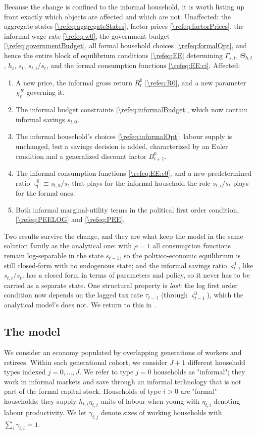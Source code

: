 \documentclass[a4paper]{article}
\begin{document}
Because the change is confined to the informal household, it is worth listing up front exactly which objects are affected and which are not. Unaffected: the aggregate states \eqref{\refeq:aggregateStates}, factor prices \eqref{\refeq:factorPrices}, the informal wage rate \eqref{\refeq:w0}, the government budget \eqref{\refeq:governmentBudget}, all formal household choices \eqref{\refeq:formalOpt}, and hence the entire block of equilibrium conditions \eqref{\refeq:EE} determining $\Gamma_{s,t}$, $\Theta_{h,t}$, $h_t$, $s_t$, $s_{t,i}/s_t$, and the formal consumption functions \eqref{\refeq:EE:ci}. Affected:
\begin{enumerate}
    \item A new price, the informal gross return $R_t^0$ \eqref{\refeq:R0}, and a new parameter $\chi_t^R$ governing it.
    \item The informal budget constraints \eqref{\refeq:informalBudget}, which now contain informal savings $s_{t,0}$.
    \item The informal household's choices \eqref{\refeq:informalOpt}: labour supply is unchanged, but a savings decision is added, characterized by an Euler condition and a generalized discount factor $B_{t+1}^0$.
    \item The informal consumption functions \eqref{\refeq:EE:c0}, and a new predetermined ratio $\varsigma_{t}^0 \equiv s_{t,0}/s_t$ that plays for the informal household the role $s_{t,i}/s_t$ plays for the formal ones.
    \item Both informal marginal-utility terms in the political first order condition, \eqref{\refeq:PEELOG} and \eqref{\refeq:PEE}.
\end{enumerate}
Two results survive the change, and they are what keep the model in the same solution family as the analytical one: with $\rho=1$ all consumption functions remain log-separable in the state $s_{t-1}$, so the politico-economic equilibrium is still closed-form with no endogenous state; and the informal savings ratio $\varsigma_t^0$, like $s_{t,i}/s_t$, has a closed form in terms of parameters and policy, so it never has to be carried as a separate state. One structural property is \emph{lost}: the log first order condition now depends on the lagged tax rate $\tau_{t-1}$ (through $\varsigma_{t-1}^0$), which the analytical model's does not. We return to this in .


\subsection{The model}\label{\refsec:model}
We consider an economy populated by overlapping generations of workers and retirees. Within each generational cohort, we consider $J+1$ different household types indexed $j= 0,...,J$. We refer to type $j=0$ households as "informal"; they work in informal markets and save through an informal technology that is not part of the formal capital stock. Households of type $i>0$ are "formal" households; they supply $h_{t,i}\eta_{t,i}$ units of labour when young with $\eta_{t,i}$ denoting labour productivity. We let $\gamma_{t,j}$ denote sizes of working households with $\sum_i \gamma_{t,i} = 1$.
\end{document}
